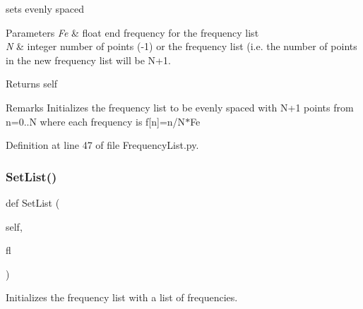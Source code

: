 sets evenly spaced 


\begin{DoxyParams}{Parameters}
{\em Fe} & float end frequency for the frequency list \\
\hline
{\em N} & integer number of points (-\/1) or the frequency list (i.\+e. the number of points in the new frequency list will be N+1. \\
\hline
\end{DoxyParams}
\begin{DoxyReturn}{Returns}
self 
\end{DoxyReturn}
\begin{DoxyRemark}{Remarks}
Initializes the frequency list to be evenly spaced with N+1 points from n=0..N where each frequency is f\mbox{[}n\mbox{]}=n/\+N$\ast$\+Fe 
\end{DoxyRemark}


Definition at line 47 of file Frequency\+List.\+py.

\mbox{\label{classSignalIntegrity_1_1FrequencyDomain_1_1FrequencyList_1_1FrequencyList_a23f5bda3ad522bcdc1af831f4178ddca}} 
\subsubsection{\texorpdfstring{Set\+List()}{SetList()}}
{\footnotesize\ttfamily def Set\+List (\begin{DoxyParamCaption}\item[{}]{self,  }\item[{}]{fl }\end{DoxyParamCaption})}



Initializes the frequency list with a list of frequencies. 


